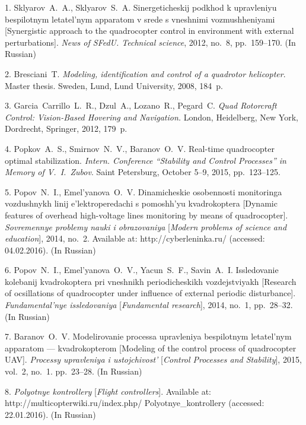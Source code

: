 

{\footnotesize

\vskip 4mm


\vskip 3mm

1. Sklyarov~A.~A., Sklyarov~S.~A. Sinergeticheskij podkhod k
upravleniyu bespilotnym letatel'nym apparatom v srede s vneshnimi
vozmushheniyami [Synergistic approach to the quadrocopter control
in environment with external perturbations].  \emph{News of SFedU.
Technical science}, 2012, no.~8, pp.~159--170. (In Russian)

2.  Bresciani~T. \emph{Modeling,  identification  and  control of
a  quadrotor  helicopter}.  Master thesis. Sweden, Lund, Lund
University, 2008, 184~p.

3.  Garcia~Carrillo~L.~R., Dzul~A., Lozano~R., Pegard~C.
\emph{Quad Rotorcraft Control: Vision-Based Hovering and
Navigation.} London, Heidelberg, New York, Dordrecht, Springer,
2012, 179~p.

4. Popkov~A.~S., Smirnov~N.~V., Baranov~O.~V. Real-time
quadrocopter optimal sta\-bi\-li\-za\-tion. \emph{Intern.
Conference ``Stability and Control Processes'' in Memory of
V.~I.~Zubov}. Saint Petersburg, October 5--9, 2015, pp.~123--125.

5. Popov~N.~I., Emel'yanova~O.~V. Dinamicheskie osobennosti
monitoringa vozdushnykh linij e'lektroperedachi s pomoshh'yu
kvadrokoptera [Dynamic features of overhead high-voltage lines
monitoring by means of quadrocopter].  \emph{Sovremennye problemy
nauki i obrazovaniya} [\emph{Modern problems of science and
education}], 2014, no.~2. Available at: http://cyberleninka.ru/
(accessed: 04.02.2016). (In Russian)\newpage

6. Popov~N.~I., Emel'yanova~O.~V., Yacun~S.~F., Savin~A.~I.
Issledovanie kolebanij kvadrokoptera pri vneshnikh periodicheskikh
vozdejstviyakh [Research of ocsillations of quadrocopter under
influence of external periodic disturbance]. \emph{Fundamental'nye
issledovaniya} [\emph{Fundamental research}], 2014, no.~1,
pp.~28--32. (In Russian)

7. Baranov~O.~V. Modelirovanie processa upravleniya bespilotnym
letatel'nym apparatom --- kvadrokopterom [Modeling of the control
process of quadrocopter UAV]. \emph{Processy upravleniya i
ustojchivost'} [\emph{Control Processes and Stability}], 2015,
vol.~2, no.~1. pp.~23--28. (In Russian)

8. {\it Polyotnye kontrollery} [{\it Flight controllers}].
Available at: http://multicopterwiki.ru/index.php/
Polyotnye\_kontrollery (accessed: 22.01.2016). (In Russian)

}
